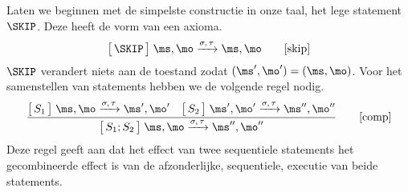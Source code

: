 Laten we beginnen met de simpelste constructie in onze taal, het lege statement $\SKIP$. Deze heeft de vorm van een axioma.
%
\begin{equation*}
  \Terminates{\SKIP}
    {\ms, \mo}
    {\sigma, \tau}
    {\ms, \mo}
  \tag*{[skip]}
\end{equation*}
%
$\SKIP$ verandert niets aan de toestand zodat $(\ms',\mo')=(\ms,\mo)$. Voor het samenstellen van statements hebben we de volgende regel nodig.
%
\begin{gather*}
  \frac{
    \Terminates{S_1}
      {\ms, \mo}
      {\sigma, \tau}
      {\ms', \mo'}
  \quad
    \Terminates{S_2}
      {\ms', \mo'}
      {\sigma, \tau}
      {\ms'', \mo''}
  }
  {
    \Terminates{S_1; S_2}
      {\ms, \mo}
      {\sigma, \tau}
      {\ms'', \mo''}
  }
  \tag*{[comp]}
\end{gather*}
%
Deze regel geeft aan dat het effect van twee sequentiele statements het gecombineerde effect is van de afzonderlijke, sequentiele, executie van beide statements.

